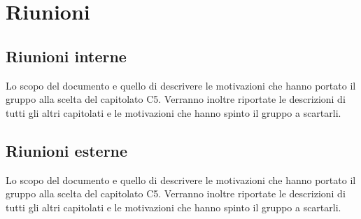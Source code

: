 \section{Riunioni}
\subsection{Riunioni interne}
Lo scopo del documento e quello di descrivere le motivazioni che hanno portato il gruppo alla scelta del capitolato C5.
Verranno inoltre riportate le descrizioni di tutti gli altri capitolati e le motivazioni che hanno spinto il gruppo a scartarli.
\subsection{Riunioni esterne}
Lo scopo del documento e quello di descrivere le motivazioni che hanno portato il gruppo alla scelta del capitolato C5.
Verranno inoltre riportate le descrizioni di tutti gli altri capitolati e le motivazioni che hanno spinto il gruppo a scartarli.